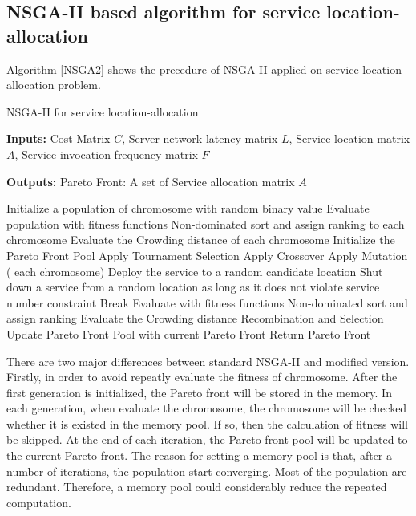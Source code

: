 \documentclass{llncs}
\begin{document}



\subsection{NSGA-II based algorithm for service location-allocation}
Algorithm \ref{NSGA2} shows the precedure of NSGA-II applied on service location-allocation problem.
\begin{algorithm}[htb]
	\caption{NSGA-II for service location-allocation}
	\label{NSGA2}
	\textbf{Inputs:}
		Cost Matrix $C$,
		Server network latency matrix $L$, 
		Service location matrix $A$, 
		Service invocation frequency matrix $F$

	\textbf{Outputs:}
		Pareto Front: A set of Service allocation matrix $A$

	\begin{algorithmic}[1]
		\State Initialize a population of chromosome with random binary value
		\State Evaluate population with fitness functions
		\State Non-dominated sort and assign ranking to each chromosome
		\State Evaluate the Crowding distance of each chromosome
		\State Initialize the Pareto Front Pool
		\State Apply Tournament Selection
		\State Apply Crossover 
		\State Apply Mutation
		\For( each chromosome)
		\State Deploy the service to a random candidate location
		\EndWhile
		\State Shut down a service from a random location as long as it does not violate service number constraint
		\State Break
		\EndIf
		\EndWhile
		\State Evaluate with fitness functions
		\EndIf
		\State Non-dominated sort and assign ranking
		\State Evaluate the Crowding distance
		\EndFor
		\State Recombination and Selection
		\State Update Pareto Front Pool with current Pareto Front
		\EndWhile
		\State Return Pareto Front
	\end{algorithmic}
\end{algorithm}

There are two major differences between standard NSGA-II and modified version. Firstly, in order to avoid repeatly evaluate the fitness
of chromosome. After the first generation is initialized, the Pareto front will be 
stored in the memory. In each generation, when evaluate the chromosome, the chromosome will be checked whether it is existed in the memory pool. 
If so, then the calculation of fitness will be skipped. At the end of each iteration, the Pareto front pool will be updated to the current Pareto front.
The reason for setting a memory pool is that, after a number of iterations, the population start converging. 
Most of the population are redundant. Therefore, a memory pool could considerably reduce the repeated computation.
\end{document}
